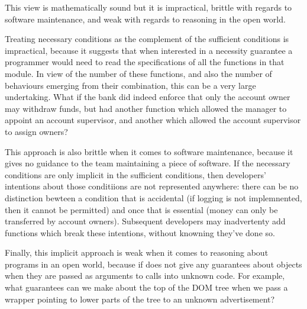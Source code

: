 This view is mathematically sound but it is impractical, brittle with
regards to software maintenance, and weak with regards to reasoning in
the open world.


Treating necessary conditions as the complement of the sufficient
conditions is impractical, because it suggests that when interested in
a necessity guarantee a programmer would need to read the
specifications of all the functions in that module.  In view of the
number of these functions, and also the number of behaviours emerging
from their combination, this can be a very large undertaking.  What if
the bank did indeed enforce that only the account owner may withdraw
funds, but had another function which allowed the manager to appoint
an account supervisor, and another which allowed the account
supervisor to assign owners?

This approach is also brittle when it comes to software maintenance,
because it gives no guidance to the team maintaining a piece of
software.  If the necessary conditions are only implicit in the
sufficient conditions, then developers' intentions about those
conditiions are not represented anywhere: there can be no distinction
bewteen a condition that is accidental (if logging is not
implemnented, then it cannot be permitted) and once that is essential
(money can only be transferred by account owners).
Subsequent developers may inadvertenty add functions which break these
intentions, without knowning they've done so.

Finally, this implicit approach is weak when it comes to reasoning
about programs in an open world, because if does not give any
guarantees about objects when they are passed as arguments to calls
into unknown code. For example, what guarantees can we make about the
top of the DOM tree when we pass a wrapper pointing to lower parts of
the tree to an unknown advertisement?
